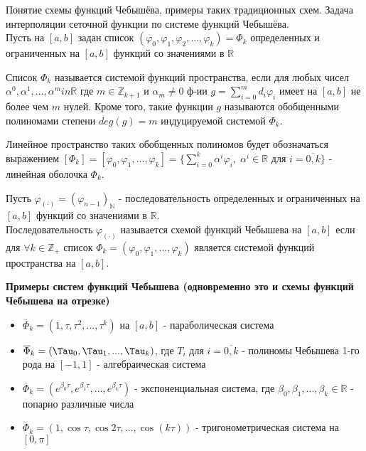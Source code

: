 \documentclass[__main__.tex]{subfiles}
\begin{document}
Понятие схемы функций Чебышёва, примеры таких традиционных схем. Задача интерполяции сеточной функции по системе функций Чебышёва.\\

Пусть на $[a, b]$ задан список $(\varphi_0, \varphi_1, \varphi_2, \text{...}, \varphi_k) = \Phi_k$ определенных и ограниченных на $[a, b]$ функций со значениями в $\mathbb{R}$

\begin{definition}
Список $\Phi_k$ называется системой функций пространства, если для любых чисел $\alpha^0, \alpha^1, \text{...}, \alpha^m in \mathbb{R}$ где $m \in \mathbb{Z}_{k+1}$ и $\alpha_m \neq 0$ ф-ии $g = \sum_{i = 0}^m d_i \varphi_i$ имеет на $[a, b]$ не более чем $m$ нулей. Кроме того, такие функции $g$ называются обобщенными полиномами степени $deg(g) = m$ индуцируемой системой $\Phi_k$.

Линейное пространство таких обобщенных полиномов будет обозначаться выражением $[\Phi_k] = [\varphi_0, \varphi_1, \text{...}, \varphi_k] = \{ \sum_{i = 0}^k \alpha^i \varphi_i, \; \alpha^i \in \mathbb{R}$ для $i = \overline{0, k} \}$ - линейная оболочка $\Phi_k$.

\end{definition}

\begin{definition}
Пусть $\varphi_{(\cdot)} = (\varphi_{n-1})_{\mathbb{N}}$ - последовательность определенных и ограниченных на $[a, b]$ функций со значениями в $\mathbb{R}$.\\
Последовательность $\varphi_{(\cdot)}$ называется схемой функций Чебышева на $[a, b]$ если для $\forall k \in \mathbb{Z}_+$ список $\Phi_k = (\varphi_0, \varphi_1, \text{...}, \varphi_k)$ является системой функций пространства на $[a, b]$.
\end{definition}

\textbf{Примеры систем функций Чебышева (одновременно это и схемы функций Чебышева на отрезке)}

\begin{itemize}

\item $\overline{\Phi}_k = (1, \tau, \tau^2, \text{...}, \tau^k)$ на $[a, b]$ - параболическая система

\item $\overline{\Phi}_k = (\Tau_0, \Tau_1, \text{...}, \Tau_k)$, где $T_i$ для $i = \overline{0, k}$ - полиномы Чебышева 1-го рода на $[-1, 1]$ - алгебраическая система 

\item $\overline{\Phi}_k = (e^{\beta_0 \tau}, e^{\beta_1 \tau}, \text{...}, e^{\beta_k \tau})$ - экспоненциальная система, где $\beta_0, \beta_1, \text{...}, \beta_k \in \mathbb{R}$ - попарно различные числа

\item $\overline{\Phi}_k = (1, \cos \tau, \cos 2 \tau, \text{...}, \cos(k \tau))$ - тригонометрическая система на $[0, \pi]$ 

\end{itemize}
\end{document}
